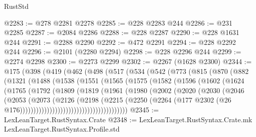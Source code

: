 \begin{lexlean}{RustStd}
\begin{coremodule}
@2283 := @278 @2281 @2278
@2285 := @228 @2283 @244
@2286 := @231 @2285
@2287 := @2084 @2286
@2288 := @228 @2287
@2290 := @228 @1631 @244
@2291 := @2288 @2290
@2292 := @472 @2291
@2294 := @228 @2292 @244
@2296 := @2101 (@2280 @2294)
@2298 := @228 @2296 @244
@2299 := @2274 @2298
@2300 := @2273 @2299
@2302 := @2267 (@1628 @2300)
@2344 := @175
    (@398
      (@419
        (@462
          (@498
            (@517
              (@534
                (@542
                  (@773
                    (@815
                      (@870
                        (@882
                          (@1321
                            (@1488
                              (@1538
                                (@1551
                                  (@1565
                                    (@1575
                                      (@1582
                                        (@1596
                                          (@1602
                                            (@1624
                                              (@1765
                                                (@1792
                                                  (@1809
                                                    (@1819
                                                      (@1961
                                                        (@1980
                                                          (@2002
                                                            (@2020
                                                              (@2030
                                                                (@2046
                                                                  (@2053
                                                                    (@2073
                                                                      (@2126
                                                                        (@2198
                                                                          (@2215
                                                                            (@2250
                                                                              (@2264
                                                                                (@177
                                                                                  @2302
                                                                                  (@26
                                                                                    @176))))))))))))))))))))))))))))))))))))))))
@2345 := LexLeanTarget.RustSyntax.Crate
@2348 := LexLeanTarget.RustSyntax.Crate.mk LexLeanTarget.RustSyntax.Profile.std

\end{coremodule}
\end{lexlean}
